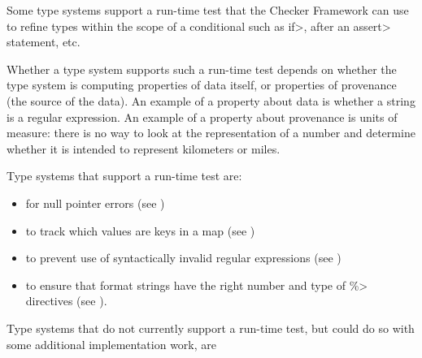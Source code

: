 Some type systems support a run-time test that the Checker Framework can
use to refine types within the scope of a conditional such as \<if>, after
an \<assert> statement, etc.

Whether a type system supports such a run-time test depends on whether the
type system is computing properties of data itself, or properties of
provenance (the source of the data).  An example of a property about data is
whether a string is a regular expression.  An example of a property about
provenance is units of measure:  there is no way to look at the
representation of a number and determine whether it is intended to
represent kilometers or miles.


Type systems that support a run-time test are:
\begin{itemize}
\item
   for null pointer errors
  (see )
\item
   to track which values are
  keys in a map (see )
\item
   to prevent use of syntactically
  invalid regular expressions (see )
\item
   to ensure that format
  strings have the right number and type of \<\%> directives (see
  ).

\end{itemize}


Type systems that do not currently support a run-time test, but could do so with some
additional implementation work, are

